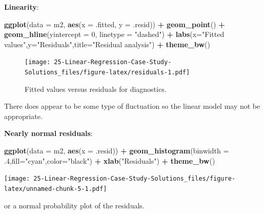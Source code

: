 \documentclass[
]{book}
\newenvironment{Shaded}{\begin{snugshade}}{\end{snugshade}}
\newcommand{\DataTypeTok}[1]{\textcolor[rgb]{0.13,0.29,0.53}{#1}}
\newcommand{\DecValTok}[1]{\textcolor[rgb]{0.00,0.00,0.81}{#1}}
\newcommand{\FloatTok}[1]{\textcolor[rgb]{0.00,0.00,0.81}{#1}}
\newcommand{\KeywordTok}[1]{\textcolor[rgb]{0.13,0.29,0.53}{\textbf{#1}}}
\newcommand{\NormalTok}[1]{#1}
\newcommand{\OperatorTok}[1]{\textcolor[rgb]{0.81,0.36,0.00}{\textbf{#1}}}
\newcommand{\StringTok}[1]{\textcolor[rgb]{0.31,0.60,0.02}{#1}}
\begin{document}
\textbf{Linearity}:

\begin{Shaded}
\begin{Highlighting}[]
\KeywordTok{ggplot}\NormalTok{(}\DataTypeTok{data =}\NormalTok{ m2, }\KeywordTok{aes}\NormalTok{(}\DataTypeTok{x =}\NormalTok{ .fitted, }\DataTypeTok{y =}\NormalTok{ .resid)) }\OperatorTok{+}
\StringTok{  }\KeywordTok{geom_point}\NormalTok{() }\OperatorTok{+}
\StringTok{  }\KeywordTok{geom_hline}\NormalTok{(}\DataTypeTok{yintercept =} \DecValTok{0}\NormalTok{, }\DataTypeTok{linetype =} \StringTok{"dashed"}\NormalTok{) }\OperatorTok{+}
\StringTok{  }\KeywordTok{labs}\NormalTok{(}\DataTypeTok{x=}\StringTok{"Fitted values"}\NormalTok{,}\DataTypeTok{y=}\StringTok{"Residuals"}\NormalTok{,}\DataTypeTok{title=}\StringTok{"Residual analysis"}\NormalTok{) }\OperatorTok{+}
\StringTok{  }\KeywordTok{theme_bw}\NormalTok{()}
\end{Highlighting}
\end{Shaded}

\begin{figure}
\centering
\texttt{[image: 25-Linear-Regression-Case-Study-Solutions\_files/figure-latex/residuals-1.pdf]}
\caption{\label{fig:residuals}Fitted values versus residuals for diagnostics.}
\end{figure}

There does appear to be some type of fluctuation so the linear model may not be appropriate.

\textbf{Nearly normal residuals}:

\begin{Shaded}
\begin{Highlighting}[]
\KeywordTok{ggplot}\NormalTok{(}\DataTypeTok{data =}\NormalTok{ m2, }\KeywordTok{aes}\NormalTok{(}\DataTypeTok{x =}\NormalTok{ .resid)) }\OperatorTok{+}
\StringTok{  }\KeywordTok{geom_histogram}\NormalTok{(}\DataTypeTok{binwidth =} \FloatTok{.4}\NormalTok{,}\DataTypeTok{fill=}\StringTok{"cyan"}\NormalTok{,}\DataTypeTok{color=}\StringTok{"black"}\NormalTok{) }\OperatorTok{+}
\StringTok{  }\KeywordTok{xlab}\NormalTok{(}\StringTok{"Residuals"}\NormalTok{) }\OperatorTok{+}
\StringTok{  }\KeywordTok{theme_bw}\NormalTok{()}
\end{Highlighting}
\end{Shaded}

\texttt{[image: 25-Linear-Regression-Case-Study-Solutions\_files/figure-latex/unnamed-chunk-5-1.pdf]}

or a normal probability plot of the residuals.
\end{document}
